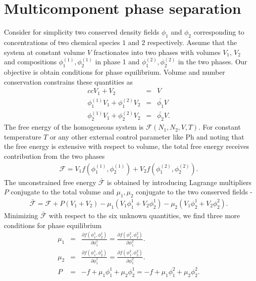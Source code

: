 
\section{Multicomponent phase separation}
Consider for simplicity two conserved density fields $\phi_1$ and $\phi_2$ corresponding to concentrations of two chemical species $1$ and $2$ respectively. Assume that the system at constant volume $V$ fractionates into two phases with volumes $V_1$, $V_2$ and compositions $\phi_1^{(1)}, \phi_2^{(1)}$ in phase 1 and $\phi_1^{(2)},\phi_2^{(2)}$ in the two phases. Our objective is obtain conditions for phase equilibrium. Volume and number conservation constrains these quantities as 
\begin{eqnarray}{cc}
    V_1 +V_2 &=& V  \\
     \phi_1^{(1)} V_1 + \phi_1^{(2)} V_2 &=&  \bar{\phi_1} V \\
     \phi_2^{(1)} V_1 + \phi_2^{(2)} V_2 &=&  \bar{\phi_2} V.
     \label{eq:constraints}
\end{eqnarray}
The free energy of the homogeneous system is $\mathcal{F}(N_1,N_2,V,T)$. For constant temperature $T$ or any other external control parameter like Ph and noting that the free energy is extensive with respect to volume, the total free energy receives contribution from the two phases 
\begin{eqnarray}
\mathcal{F} = V_1 f(\phi_1^{(1)},\phi_2^{(1)}) + V_2 f(\phi_1^{(2)},\phi_2^{(2)}).
\label{eq:TotalFreeEnergy}
\end{eqnarray}
The unconstrained free energy $\bar{\mathcal{F}}$ is obtained by introducing Lagrange multipliers $P$ conjugate to the total volume and $\mu_1,\mu_2$ conjugate to the two conserved fields - 
\begin{eqnarray}
\bar{\mathcal{F}} = \mathcal{F} +P(V_1 + V_2) - \mu_1 (V_1 \phi_1^1 + V_2 \phi_2^1) - \mu_2 (V_1 \phi_2^1 + V_2 \phi_2^2).
\end{eqnarray}
Minimizing $\bar{\mathcal{F}}$ with respect to the six unknown quantities, we find three more conditions for phase equilibrium
\begin{eqnarray}
\mu_1 &=& \frac{\partial f(\phi_1^1,\phi_2^1)}{\partial \phi_1^1} = \frac{\partial f(\phi_1^2,\phi_2^2)}{\partial \phi_1^2}. \\
\mu_2 &=& \frac{\partial f(\phi_1^1,\phi_2^1)}{\partial \phi_1^1} = \frac{\partial f(\phi_1^2,\phi_2^2)}{\partial \phi_1^2}. \\
P &=& -f + \mu_1 \phi_1^1 + \mu_2 \phi_2^1  = -f + \mu_1 \phi_1^2 + \mu_2 \phi_2^2. 
\label{eq:Equilibrium}
\end{eqnarray}
